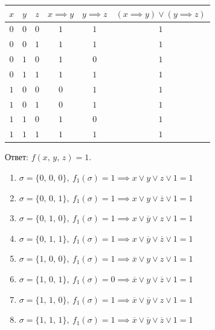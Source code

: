 \documentclass[12pt,a4paper]{article}
\theoremstyle{plain}
\theoremstyle{definition}
\theoremstyle{remark}
\numberwithin{equation}{section}
\begin{document}
\begin{figure}[H]
  \begin{minipage}[t]{0.53\textwidth}
    \vspace{0em}
    \begin{tabularx}{\textwidth}{|c|c|c|c|c|C|}
      \hline
      $x$ & $y$ & $z$ & $x \implies y$ & $y \implies z$ & $(x \implies y) \lor (y \implies z)$ \\
      \hline
      $0$ & $0$ & $0$ & $1$ & $1$ & $1$ \\
      $0$ & $0$ & $1$ & $1$ & $1$ & $1$ \\  
      $0$ & $1$ & $0$ & $1$ & $0$ & $1$ \\
      $0$ & $1$ & $1$ & $1$ & $1$ & $1$ \\
      $1$ & $0$ & $0$ & $0$ & $1$ & $1$ \\
      $1$ & $0$ & $1$ & $0$ & $1$ & $1$ \\
      $1$ & $1$ & $0$ & $1$ & $0$ & $1$ \\
      $1$ & $1$ & $1$ & $1$ & $1$ & $1$ \\
      \hline  
    \end{tabularx}
    
    \vspace{0.5em}
    \noindent Ответ: $f(x,\,y,\,z) = 1$.
  \end{minipage} \hfill 
  \begin{minipage}[t]{0.47\textwidth}
    \vspace{0em}
    \begin{enumerate}
      \item $\sigma = \{0,\,0,\,0\},\ f_1(\sigma) = 1 \implies x \lor y \lor z \lor 1 = 1$
      \item $\sigma = \{0,\,0,\,1\},\ f_1(\sigma) = 1 \implies x \lor y \lor \overline{z} \lor 1 = 1$
      \item $\sigma = \{0,\,1,\,0\},\ f_1(\sigma) = 1 \implies x\lor \overline{y} \lor z \lor 1 = 1$
      \item $\sigma = \{0,\,1,\,1\},\ f_1(\sigma) = 1 \implies x \lor \overline{y} \lor \overline z \lor 1 = 1$
      \item $\sigma = \{1,\,0,\,0\},\ f_1(\sigma) = 1 \implies \overline{x} \lor y \lor z \lor 1 = 1$
      \item $\sigma = \{1,\,0,\,1\},\ f_1(\sigma) = 0 \implies \overline{x} \lor y \lor \overline{z} \lor 1 = 1$
      \item $\sigma = \{1,\,1,\,0\},\ f_1(\sigma) = 1 \implies \overline{x} \lor \overline{y} \lor z \lor 1 = 1$
      \item $\sigma = \{1,\,1,\,1\},\ f_1(\sigma) = 1 \implies \overline{x} \lor \overline y \lor \overline z \lor 1 = 1$
    \end{enumerate}
  \end{minipage}
\end{figure}
\end{document}
